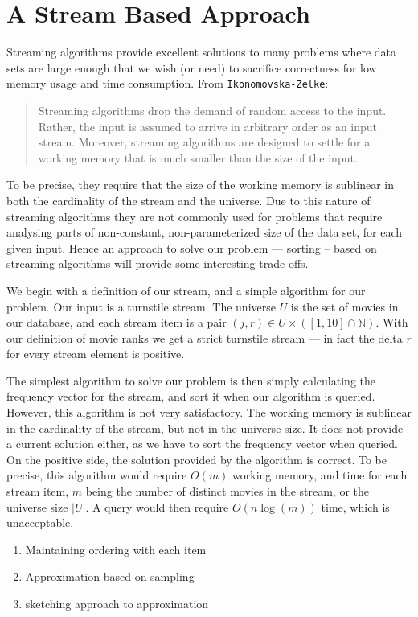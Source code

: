\section*{A Stream Based Approach}
Streaming algorithms provide excellent solutions to many problems where data
sets are large enough that we wish (or need) to sacrifice correctness for low
memory usage and time consumption.
From \texttt{Ikonomovska\--Zelke}:
\begin{quote}
Streaming algorithms drop the demand of random access to the input. Rather, the input
is assumed to arrive in arbitrary order as an input stream. Moreover, streaming algorithms
are designed to settle for a working memory that is much smaller than the size of the input.
\end{quote}
To be precise, they require that the size of the working memory is sublinear in both the cardinality of the stream and the universe.
Due to this nature of streaming algorithms they are not commonly used for
problems that require analysing parts of non-constant, non-parameterized size
of the data set, for each given input. Hence an approach to
solve our problem --- sorting -- based on streaming algorithms will provide some interesting
trade-offs.

We begin with a definition of our stream, and a simple algorithm for our
problem. Our input is a turnstile stream. The universe
$U$ is the set of movies in our database, and each stream item is a pair
$(j,r) \in U\times \left(\left[1,10\right]\cap \mathbb{N}\right)$.
With our definition of movie ranks we get a strict turnstile stream --- 
in fact the delta $r$ for every stream element is positive.

The simplest algorithm to solve our problem is then simply calculating the
frequency vector for the stream, and sort it when our algorithm is queried.
However, this algorithm is not very satisfactory. The working memory is
sublinear in the cardinality of the stream, but not in the universe size. It
does not provide a current solution either, as we have to sort the frequency
vector when queried. On the positive side, the solution provided by the
algorithm is correct. To be precise, this algorithm would require $O(m)$ working
memory, and time for each stream item, $m$ being the number of distinct movies
in the stream, or the universe size $|U|$. A query would then require
$O(n \log(m))$ time, which is unacceptable.

\begin{enumerate}
	\item{Maintaining ordering with each item}
	\item{Approximation based on sampling}
	\item{sketching approach to approximation}
\end{enumerate}

